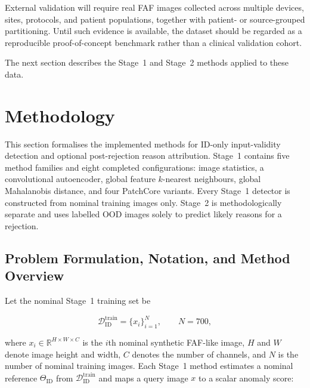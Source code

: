 \documentclass[fleqn,12pt]{olplainarticle}
\begin{document}
External validation will require real FAF images collected across multiple
devices, sites, protocols, and patient populations, together with patient- or
source-grouped partitioning. Until such evidence is available, the dataset
should be regarded as a reproducible proof-of-concept benchmark rather than a
clinical validation cohort.

The next section describes the Stage~1 and Stage~2 methods applied to these
data.

\newpage


\section{Methodology}
\label{sec:methodology}

This section formalises the implemented methods for ID-only input-validity
detection and optional post-rejection reason attribution. Stage~1 contains
five method families and eight completed configurations: image statistics, a
convolutional autoencoder, global feature $k$-nearest neighbours, global
Mahalanobis distance, and four PatchCore variants. Every Stage~1 detector is
constructed from nominal training images only. Stage~2 is methodologically
separate and uses labelled OOD images solely to predict likely reasons for a
rejection.

\subsection{Problem Formulation, Notation, and Method Overview}
\label{subsec:method_overview}

Let the nominal Stage~1 training set be

\begin{equation}
    \mathcal{D}_{\mathrm{ID}}^{\mathrm{train}}
    =
    \{x_i\}_{i=1}^{N},
    \qquad
    N=700,
    \label{eq:method_id_training_set}
\end{equation}

where $x_i\in\mathbb{R}^{H\times W\times C}$ is the $i$th nominal synthetic
FAF-like image, $H$ and $W$ denote image height and width, $C$ denotes the
number of channels, and $N$ is the number of nominal training images. Each
Stage~1 method estimates a nominal reference
$\Theta_{\mathrm{ID}}$ from
$\mathcal{D}_{\mathrm{ID}}^{\mathrm{train}}$ and maps a query image $x$ to a
scalar anomaly score:
\end{document}
